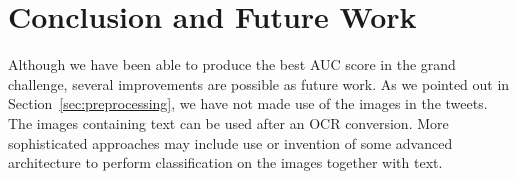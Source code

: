 \section{Conclusion and Future Work}
Although we have been able to produce the best AUC score in the grand challenge, several improvements are possible as future work. As we pointed out in Section~\ref{sec:preprocessing}, we have not made use of the images in the tweets. The images containing text can be used after an OCR conversion.  More sophisticated approaches may include use or invention of some advanced architecture to perform classification on the images together with text. 